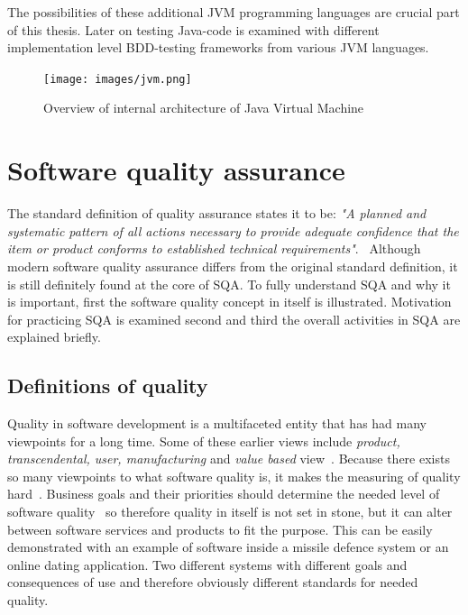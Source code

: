     The possibilities of these additional JVM programming languages are crucial part of this thesis. Later on testing Java-code is examined with
    different implementation level BDD-testing frameworks from various JVM languages.

    \begin{figure}[ht]
      \begin{center}
        \texttt{[image: images/jvm.png]}
        \caption{Overview of internal architecture of Java Virtual Machine}
        \label{fig:JVM}
      \end{center}
    \end{figure}

\section{Software quality assurance}
    The standard definition of quality assurance states it to be:
        \textit{"A planned and systematic pattern
        of all actions necessary to provide adequate confidence
        that the item or product conforms to established
        technical requirements"}.~\cite{buckley1978standard}
    Although modern software quality assurance differs from the original standard definition, it is still definitely found
    at the core of SQA. To fully understand SQA and why it is important, first the software quality concept in itself is illustrated.
    Motivation for practicing SQA is examined second and third the overall activities in SQA are explained briefly.
    \subsection{Definitions of quality}
    Quality in software development is a multifaceted entity that has had many viewpoints for a long time.
    Some of these earlier views include \textit{product, transcendental, user, manufacturing} and \textit{value based} view~\cite{kitchenham1996elusive}.
    Because there exists so many viewpoints to what software quality is, it makes the measuring of quality hard~\cite{kitchenham1996elusive}.
    Business goals and their priorities should determine the needed level of software quality~\cite{kitchenham1996elusive} so therefore
    quality in itself is not set in stone, but it can alter between software services and products to fit the purpose.
    This can be easily demonstrated with an example of software inside a missile defence system or an online dating application.
    Two different systems with different goals and consequences of use and therefore obviously different standards for needed quality.

